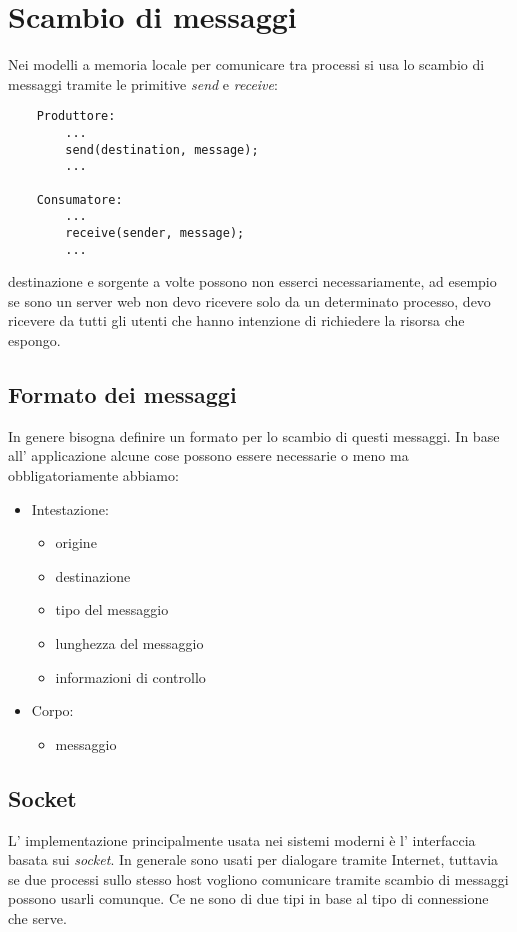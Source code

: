 \section{Scambio di messaggi}
Nei modelli a memoria locale per comunicare tra processi si usa lo scambio di messaggi tramite le primitive \emph{send} e \emph{receive}:
\begin{verbatim}
    Produttore:
        ...
        send(destination, message);
        ...
        
    Consumatore:
        ...
        receive(sender, message);
        ...
\end{verbatim}
destinazione e sorgente a volte possono non esserci necessariamente, ad esempio se sono un server web non devo ricevere solo da un determinato processo, devo ricevere da tutti gli utenti che hanno intenzione di richiedere la risorsa che espongo.

\subsection{Formato dei messaggi}
In genere bisogna definire un formato per lo scambio di questi messaggi.
In base all' applicazione alcune cose possono essere necessarie o meno ma obbligatoriamente abbiamo:
\begin{itemize}
    \item Intestazione: 
    \begin{itemize}
        \item origine
        \item destinazione
        \item tipo del messaggio
        \item lunghezza del messaggio
        \item informazioni di controllo
    \end{itemize}
    \item Corpo:
        \begin{itemize}
            \item messaggio
        \end{itemize}
\end{itemize}

\subsection{Socket}
L' implementazione principalmente usata nei sistemi moderni è l' interfaccia basata sui \emph{socket}.
In generale sono usati per dialogare tramite Internet, tuttavia se due processi sullo stesso host vogliono comunicare tramite scambio di messaggi possono usarli comunque.
Ce ne sono di due tipi in base al tipo di connessione che serve.

